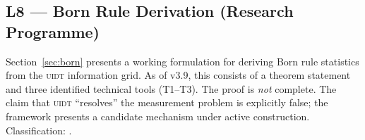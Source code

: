 \subsection{L8 --- Born Rule Derivation (Research Programme)}
\label{lim:L8}
\begin{limitation}
Section~\ref{sec:born} presents a working formulation for deriving Born
rule statistics from the \textsc{uidt} information grid. As of v3.9, this
consists of a theorem statement and three identified technical tools
(T1--T3). The proof is \emph{not} complete. The claim that \textsc{uidt}
``resolves'' the measurement problem is explicitly false; the framework
presents a candidate mechanism under active construction.
Classification: \evE{}.
\end{limitation}
